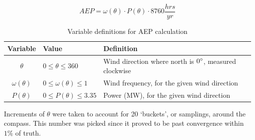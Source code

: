\documentclass[12pt]{article}
\begin{document}
    \begin{equation}
        AEP = \omega (\theta) \cdot P (\theta) \cdot 8760 \frac{hrs}{yr}
        \label{Eq:AEP}
    \end{equation}
\vspace{-0.5cm}
    \begin{table}[H]
        \centering
        \begin{tabular}{|c|l|l|}
            \hline
            Variable & Value & Definition \\ \hline
            $\theta$ & $0 \leq \theta \leq 360$ & Wind direction where north is $0 \degree$, measured clockwise \\ \hline
            $\omega(\theta)$ & $0 \leq \omega(\theta) \leq 1$ & Wind frequency, for the given wind direction \\ \hline
            $P(\theta)$ & $0 \leq P(\theta) \leq 3.35 $ & Power (MW), for the given wind direction \\ \hline
        \end{tabular}
        \caption{Variable definitions for AEP calculation}
        \label{tab:AEP}
    \end{table}
    
    Increments of $\theta$ were taken to account for 20 `buckets', or samplings, around the compass. This number was picked since it proved to be past convergence within $1\%$ of truth.

\newpage
\section*{}


\end{document}
